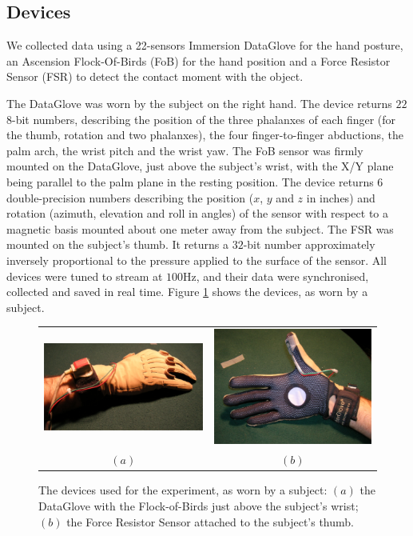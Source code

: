 \subsection*{Devices}

We collected data using a 22-sensors Immersion DataGlove for the hand
posture, an Ascension Flock-Of-Birds (FoB) for the hand position and a
Force Resistor Sensor (FSR) to detect the contact moment with the
object.

The DataGlove was worn by the subject on the right hand. The device
returns $22$ $8$-bit numbers, describing the position of the three
phalanxes of each finger (for the thumb, rotation and two phalanxes),
the four finger-to-finger abductions, the palm arch, the wrist pitch
and the wrist yaw. The FoB sensor was firmly mounted on the DataGlove,
just above the subject's wrist, with the X/Y plane being parallel to
the palm plane in the resting position. The device returns $6$
double-precision numbers describing the position ($x$, $y$ and $z$ in
inches) and rotation (azimuth, elevation and roll in angles) of the
sensor with respect to a magnetic basis mounted about one meter away
from the subject. The FSR was mounted on the subject's thumb. It
returns a $32$-bit number approximately inversely proportional to the
pressure applied to the surface of the sensor. All devices were tuned
to stream at $100$Hz, and their data were synchronised, collected and
saved in real time. Figure \ref{fig:devices} shows the devices, as
worn by a subject.

\begin{figure}[htbp]
  \begin{center}
    \begin{tabular}{cc}
      \includegraphics[width=0.45\linewidth]{devices1.eps} &
      \includegraphics[width=0.45\linewidth]{devices2.eps} \\
      $(a)$ & $(b)$
    \end{tabular}
    \caption{The devices used for the experiment, as worn by a
    subject: $(a)$ the DataGlove with the Flock-of-Birds just above the
    subject's wrist; $(b)$ the Force Resistor Sensor attached to the
    subject's thumb.}
    \label{fig:devices}
  \end{center}
\end{figure}

